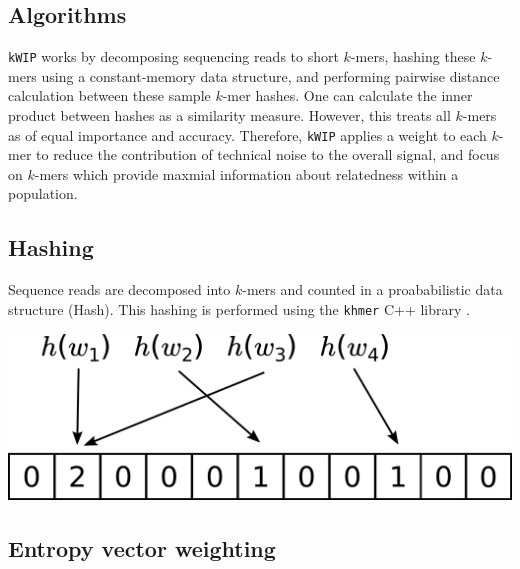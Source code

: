 \documentclass[a0,portrait]{a0poster}
\begin{document}
\begin{multicols}{2}

\section*{Algorithms}

\texttt{kWIP} works by decomposing sequencing reads to short $k$-mers, hashing
these $k$-mers using a constant-memory data structure, and performing pairwise
distance calculation between these sample $k$-mer hashes. One can calculate
the inner product between hashes as a similarity measure. However, this treats
all $k$-mers as of equal importance and accuracy. Therefore, \texttt{kWIP}
applies a weight to each $k$-mer to reduce the contribution of technical noise
to the overall signal, and focus on $k$-mers which provide maxmial information
about relatedness within a population.


\subsection*{Hashing}

Sequence reads are decomposed into $k$-mers and counted in a proababilistic
data structure (Hash). This hashing is performed using the \texttt{khmer} C++
library \cite{crusoe_khmer_2015}.

\begin{center}
  \vspace{1cm}
  \includegraphics[width=20cm]{hashing.png}
  \vspace{1cm}
\end{center}

\subsection*{Entropy vector weighting}


\end{multicols}
\end{document}
